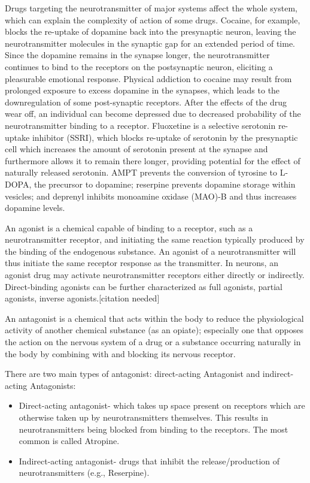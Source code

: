 Drugs targeting the neurotransmitter of major systems affect the whole system, which can explain the complexity of action of some drugs. Cocaine, for example, blocks the re-uptake of dopamine back into the presynaptic neuron, leaving the neurotransmitter molecules in the synaptic gap for an extended period of time. Since the dopamine remains in the synapse longer, the neurotransmitter continues to bind to the receptors on the postsynaptic neuron, eliciting a pleasurable emotional response. Physical addiction to cocaine may result from prolonged exposure to excess dopamine in the synapses, which leads to the downregulation of some post-synaptic receptors. After the effects of the drug wear off, an individual can become depressed due to decreased probability of the neurotransmitter binding to a receptor. Fluoxetine is a selective serotonin re-uptake inhibitor (SSRI), which blocks re-uptake of serotonin by the presynaptic cell which increases the amount of serotonin present at the synapse and furthermore allows it to remain there longer, providing potential for the effect of naturally released serotonin. AMPT prevents the conversion of tyrosine to L-DOPA, the precursor to dopamine; reserpine prevents dopamine storage within vesicles; and deprenyl inhibits monoamine oxidase (MAO)-B and thus increases dopamine levels.

An agonist is a chemical capable of binding to a receptor, such as a neurotransmitter receptor, and initiating the same reaction typically produced by the binding of the endogenous substance. An agonist of a neurotransmitter will thus initiate the same receptor response as the transmitter. In neurons, an agonist drug may activate neurotransmitter receptors either directly or indirectly. Direct-binding agonists can be further characterized as full agonists, partial agonists, inverse agonists.{[}citation needed{]}

An antagonist is a chemical that acts within the body to reduce the physiological activity of another chemical substance (as an opiate); especially one that opposes the action on the nervous system of a drug or a substance occurring naturally in the body by combining with and blocking its nervous receptor.

There are two main types of antagonist: direct-acting Antagonist and indirect-acting Antagonists:

\begin{itemize}
\tightlist
\item
  Direct-acting antagonist- which takes up space present on receptors which are otherwise taken up by neurotransmitters themselves. This results in neurotransmitters being blocked from binding to the receptors. The most common is called Atropine.
\item
  Indirect-acting antagonist- drugs that inhibit the release/production of neurotransmitters (e.g., Reserpine).
\end{itemize}

